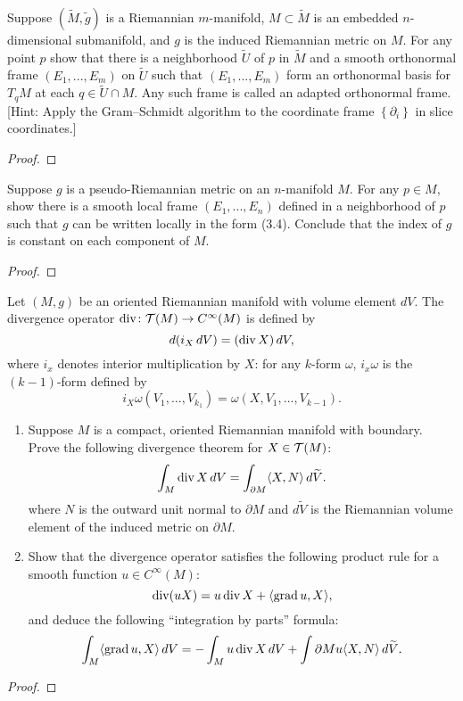 \begin{problem}
Suppose $(\widetilde M,\tilde g)$ is a Riemannian $m$-manifold,
$M\subset\widetilde M$ is an embedded $n$-dimensional submanifold, and $g$
is the induced Riemannian metric on $M$. For any point $p$ show that there
is a neighborhood $\widetilde U$ of $p$ in $\widetilde M$ and a smooth
orthonormal frame $(E_1,...,E_m)$ on $\widetilde U$ such that
$(E_1,...,E_m)$ form an orthonormal basis for $T_qM$ at each
$q\in\widetilde{U}\cap M$. Any such frame is called an adapted orthonormal
frame. [Hint: Apply the Gram--Schmidt algorithm to the coordinate frame
$\left\{\partial_i\right\}$ in slice coordinates.]
\end{problem}
\begin{proof}
\end{proof}
\newpage

\begin{problem}
Suppose $g$ is a pseudo-Riemannian metric on an $n$-manifold $M$. For any
$p\in M$, show there is a smooth local frame $(E_1,...,E_n)$ defined in a
neighborhood of $p$ such that $g$ can be written locally in the form
(3.4). Conclude that the index of $g$ is constant on each component of
$M$.
\end{problem}
\begin{proof}
\end{proof}
\newpage

\begin{problem}
Let $(M,g)$ be an oriented Riemannian manifold with volume element
$dV$. The divergence operator $\operatorname{div}\colon\mathcal{T}(M)\to C^\infty(M)$ is
defined by
\[
d(i_X\,dV)=(\operatorname{div} X)\,dV,
\]
where $i_x$ denotes interior multiplication by $X$: for any $k$-form
$\omega$, $i_x\omega$ is the $(k-1)$-form defined by
\[
i_X\omega(V_1,...,V_{k_1})=\omega(X,V_1,...,V_{k-1}).
\]
\begin{enumerate}[label=(\alph*)]
\item Suppose $M$ is a compact, oriented Riemannian manifold with
  boundary. Prove the following divergence theorem for $X\in\mathcal{T}(M)$:
\[
\int_M\operatorname{div} X\,dV=\int_{\partial M}\langle X,N \rangle\,d\widetilde V.
\]
where $N$ is the outward unit normal to $\partial M$ and $d\widetilde V$ is
the Riemannian volume element of the induced metric on $\partial M$.
\item Show that the divergence operator satisfies the following product
  rule for a smooth function $u\in C^\infty(M)$:
\[
\operatorname{div}(uX)=u\operatorname{div} X+\langle\operatorname{grad} u,X\rangle,
\]
and deduce the following ``integration by parts'' formula:
\[
\int_M\langle\operatorname{grad} u,X\rangle\,dV=-\int_M u\operatorname{div} X\,dV+\int{\partial M}
u\langle X,N\rangle\,d\widetilde{V}.
\]
\end{enumerate}
\end{problem}
\begin{proof}
\end{proof}
\newpage

